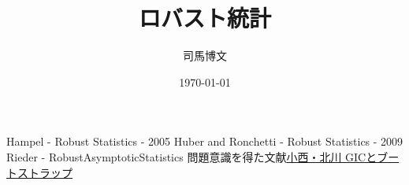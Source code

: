 \documentclass[uplatex,dvipdfmx]{jsreport}
\title{ロバスト統計}
\author{司馬博文}
\date{\today}
\begin{document}
\tableofcontents



\begin{thebibliography}{9}
    Hampel - Robust Statistics - 2005
    Huber and Ronchetti - Robust Statistics - 2009
    Rieder - RobustAsymptoticStatistics
    問題意識を得た文献\href{https://www.ism.ac.jp/editsec/toukei/pdf/47-2-375.pdf}{小西・北川 GICとブートストラップ}
\end{thebibliography}
\end{document}
